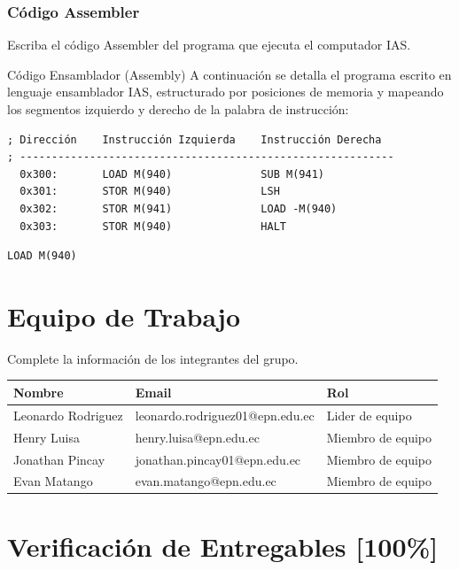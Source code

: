 \documentclass{article}
\begin{document}
\subsubsection{Código Assembler}
\label{sec:org14cb4f6}

Escriba el código Assembler del programa que ejecuta el computador
IAS.

Código Ensamblador (Assembly)
A continuación se detalla el programa escrito en lenguaje ensamblador IAS, estructurado por posiciones de memoria y mapeando los segmentos izquierdo y derecho de la palabra de instrucción:

\begin{verbatim}
; Dirección    Instrucción Izquierda    Instrucción Derecha
; -----------------------------------------------------------
  0x300:       LOAD M(940)              SUB M(941)
  0x301:       STOR M(940)              LSH
  0x302:       STOR M(941)              LOAD -M(940)
  0x303:       STOR M(940)              HALT
\end{verbatim}

\begin{verbatim}
LOAD M(940)

\end{verbatim}

\section{Equipo de Trabajo}
\label{sec:org1e13499}

Complete la información de los integrantes del grupo.
\begin{center}
\begin{tabular}{lll}
Nombre & Email & Rol\\[0pt]
\hline
Leonardo Rodriguez & leonardo.rodriguez01@epn.edu.ec & Lider de equipo\\[0pt]
Henry Luisa & henry.luisa@epn.edu.ec & Miembro de equipo\\[0pt]
Jonathan Pincay & jonathan.pincay01@epn.edu.ec & Miembro de equipo\\[0pt]
Evan Matango & evan.matango@epn.edu.ec & Miembro de equipo\\[0pt]
\end{tabular}
\end{center}

\section{Verificación de Entregables [100\%]}
\label{sec:orgd956de5}
\end{document}
